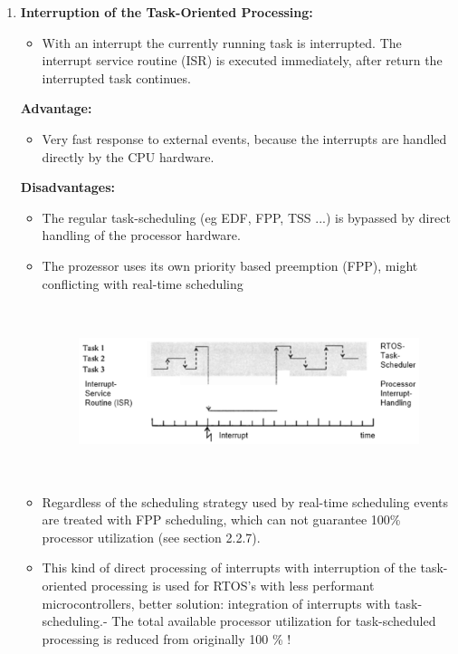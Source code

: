 \begin{enumerate}
\item {\rot\bf Interruption of the Task-Oriented Processing: }

\begin{itemize}
	\item With an interrupt the currently running task is interrupted. The interrupt service routine (ISR) is executed immediately, after return the interrupted task continues.
\end{itemize}

\textbf{Advantage: } 

\begin{itemize}
	\item Very fast response to external events, because the interrupts are handled directly   by the CPU hardware.
\end{itemize} 

\textbf{Disadvantages: }

\begin{itemize}

\item The regular task-scheduling (eg EDF, FPP, TSS ...) is bypassed by direct handling   of the processor hardware.

\item The prozessor uses its own priority based preemption (FPP), might conflicting with real-time scheduling

 	\begin{figure}[h]
    \centering
    \includegraphics[width=14cm, height=5cm]{Images/image22.png}
    \label{fig:Fig 76}
    \end{figure}

\item Regardless of the scheduling strategy used by real-time scheduling events are treated with FPP scheduling, which can not guarantee 100\% processor utilization   (see section 2.2.7).

\item This kind of direct processing of interrupts with interruption of the task-oriented   processing is used for RTOS's with less performant microcontrollers,   better solution: integration of interrupts with task-scheduling.- The total available processor utilization for task-scheduled processing is reduced from originally 100 \% !
\end{itemize}


\end{enumerate}
